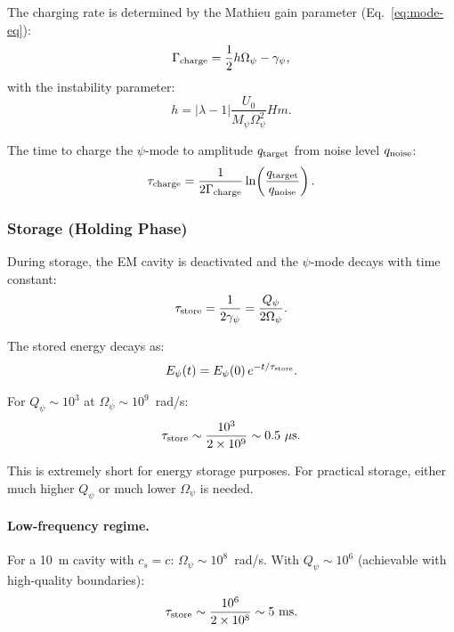 \documentclass[aps,prd,twocolumn,showpacs,preprintnumbers,superscriptaddress,nofootinbib]{revtex4-2}
\begin{document}
The charging rate is determined by the Mathieu gain parameter
(Eq.~\ref{eq:mode-eq}):
\begin{equation}
\Gamma_{\rm charge} = \frac{1}{2}h\Omega_\psi - \gamma_\psi,
\end{equation}
with the instability parameter:
\begin{equation}
h = |\lambda-1|\frac{U_0}{M_\psi\Omega_\psi^2}Hm.
\end{equation}

The time to charge the $\psi$-mode to amplitude $q_{\rm target}$ from
noise level $q_{\rm noise}$:
\begin{equation}
\tau_{\rm charge} = \frac{1}{2\Gamma_{\rm charge}}\ln\!\left(\frac{q_{\rm target}}{q_{\rm noise}}\right).
\end{equation}

\subsubsection{Storage (Holding Phase)}

During storage, the EM cavity is deactivated and the $\psi$-mode
decays with time constant:
\begin{equation}
\tau_{\rm store} = \frac{1}{2\gamma_\psi} = \frac{Q_\psi}{2\Omega_\psi}.
\end{equation}

The stored energy decays as:
\begin{equation}
E_\psi(t) = E_\psi(0)\,e^{-t/\tau_{\rm store}}.
\end{equation}

For $Q_\psi \sim 10^3$ at $\Omega_\psi \sim 10^9$~rad/s:
\begin{equation}
\tau_{\rm store} \sim \frac{10^3}{2\times 10^9} \sim 0.5~\mu\text{s}.
\end{equation}

This is extremely short for energy storage purposes.  For practical
storage, either much higher $Q_\psi$ or much lower $\Omega_\psi$ is
needed.

\paragraph{Low-frequency regime.}  For a 10~m cavity with $c_s = c$:
$\Omega_\psi \sim 10^8$~rad/s.  With $Q_\psi \sim 10^6$
(achievable with high-quality boundaries):
\begin{equation}
\tau_{\rm store} \sim \frac{10^6}{2\times 10^8} \sim 5~\text{ms}.
\end{equation}
\end{document}
